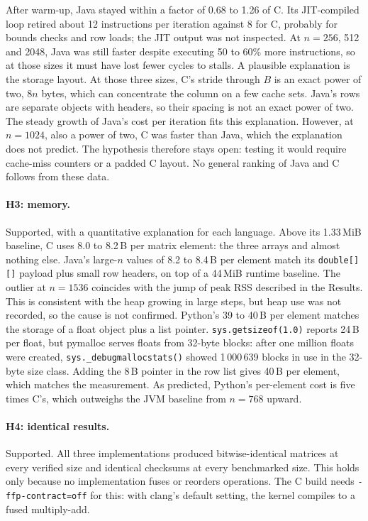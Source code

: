\documentclass[11pt,a4paper]{article}
\begin{document}
After warm-up, Java stayed within a factor of 0.68 to 1.26 of C. Its
JIT-compiled loop retired about 12 instructions per iteration against 8 for C,
probably for bounds checks and row loads; the JIT output was not inspected.
At $n=256$, 512 and 2048, Java was still faster despite executing 50 to 60\%
more instructions, so at those sizes it must have lost fewer cycles to stalls. A
plausible explanation is the storage layout. At those three sizes, C's stride
through $B$ is an exact power of two, $8n$ bytes, which can concentrate the
column on a few cache sets. Java's rows are separate objects with headers, so
their spacing is not an exact power of two. The steady growth of Java's cost per
iteration fits this explanation. However, at $n=1024$, also a power of two, C
was faster than Java, which the explanation does not predict. The hypothesis
therefore stays open: testing it would require cache-miss counters or a padded C
layout. No general ranking of Java and C follows from these data.

\paragraph{H3: memory.} Supported, with a quantitative explanation for each
language. Above its 1.33\,MiB baseline, C uses 8.0 to 8.2\,B per matrix element:
the three arrays and almost nothing else. Java's large-$n$ values of 8.2 to 8.4\,B per
element match its \texttt{double[][]} payload plus small row headers, on top of
a 44\,MiB runtime baseline. The outlier at $n=1536$ coincides with the jump of
peak RSS described in the Results. This is consistent with the heap growing in
large steps, but heap use was not recorded, so the cause is not confirmed.
Python's 39 to 40\,B per element matches the storage of a float object plus a
list pointer. \texttt{sys.getsizeof(1.0)} reports 24\,B per float, but pymalloc
serves floats from 32-byte blocks: after one million floats were created,
\texttt{sys.\_debugmallocstats()} showed 1\,000\,639 blocks in use in the
32-byte size class. Adding the 8\,B pointer in the row list gives 40\,B per
element, which matches the measurement. As predicted, Python's per-element cost
is five times C's, which outweighs the JVM baseline from $n=768$ upward.

\paragraph{H4: identical results.} Supported. All three implementations
produced bitwise-identical matrices at every verified size and identical
checksums at every benchmarked size. This holds only because no implementation
fuses or reorders operations. The C build needs \texttt{-ffp-contract=off}
for this: with clang's default setting, the kernel compiles to a fused
multiply-add.
\end{document}
